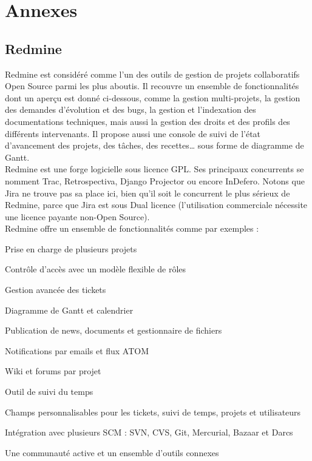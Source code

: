 \chapter{Annexes}
\label{Annexes}

\section{Redmine}\label{Annexe A}

Redmine est considéré comme l’un des outils de gestion de projets collaboratifs Open Source parmi les plus aboutis. Il recouvre un ensemble de fonctionnalités dont un aperçu est donné ci-dessous, comme la gestion multi-projets, la gestion des demandes d’évolution et des bugs, la gestion et l’indexation des documentations techniques, mais aussi la gestion des droits et des profils des différents intervenants. Il propose aussi une console de suivi de l’état d’avancement des projets, des tâches, des recettes… sous forme de diagramme de Gantt.\\

Redmine est une forge logicielle sous licence GPL. Ses principaux concurrents se nomment Trac, Retrospectiva, Django Projector ou encore InDefero. Notons que Jira ne trouve pas sa place ici, bien qu’il soit le concurrent le plus sérieux de Redmine, parce que Jira est sous Dual licence (l’utilisation commerciale nécessite une licence payante non-Open Source).\\

Redmine offre un ensemble de fonctionnalités comme par exemples :

\begin{itemsize}
\item Prise en charge de plusieurs projets
\item Contrôle d’accès avec un modèle flexible de rôles
\item Gestion avancée des tickets
\item Diagramme de Gantt et calendrier
\item Publication de news, documents et gestionnaire de fichiers
\item Notifications par emails et flux ATOM
\item Wiki et forums par projet
\item Outil de suivi du temps
\item Champs personnalisables pour les tickets, suivi de temps, projets et utilisateurs
\item Intégration avec plusieurs SCM : SVN, CVS, Git, Mercurial, Bazaar et Darcs
\item Une communauté active et un ensemble d’outils connexes
\end{itemsize}\\


